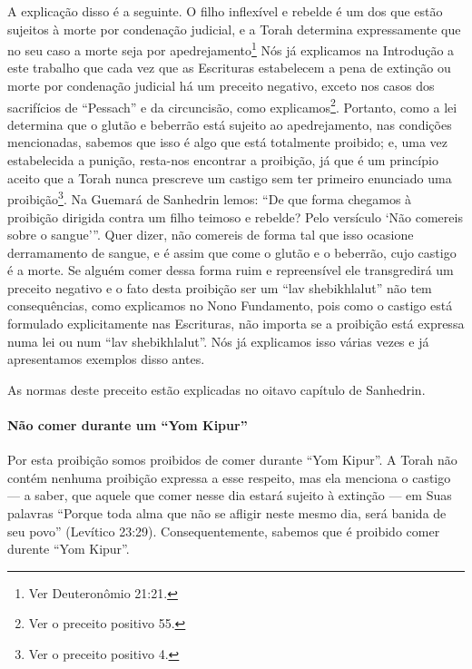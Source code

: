A explicação disso é a seguinte. O filho inflexível e rebelde é um dos
que estão sujeitos à morte por condenação judicial, e a Torah determina
expressamente que no seu caso a morte seja por
apedrejamento\footnote{Ver Deuteronômio 21:21.} Nós já explicamos na Introdução a
este trabalho que cada vez que as Escrituras estabelecem a pena de
extinção ou morte por condenação judicial há um preceito negativo,
exceto nos casos dos sacrifícios de ``Pessach'' e da circuncisão, como
explicamos\footnote{Ver o preceito positivo 55.}. Portanto, como a lei determina que o
glutão e beberrão está sujeito ao apedrejamento, nas condições
mencionadas, sabemos que isso é algo que está totalmente proibido; e,
uma vez estabelecida a punição, resta-nos encontrar a proibição, já que
é um princípio aceito que a Torah nunca prescreve um castigo sem ter
primeiro enunciado uma proibição\footnote{Ver o preceito positivo 4.}. Na Guemará de
Sanhedrin lemos: ``De que forma chegamos à proibição dirigida contra um
filho teimoso e rebelde? Pelo versículo `Não comereis sobre o sangue'''.
Quer dizer, não comereis de forma tal que isso ocasione derramamento de
sangue, e é assim que come o glutão e o beberrão, cujo castigo é a
morte. Se alguém comer dessa forma ruim e repreensível ele transgredirá
um preceito negativo e o fato desta proibição ser um ``lav
shebikhlalut'' não tem consequências, como explicamos no Nono
Fundamento, pois como o castigo está formulado explicitamente nas
Escrituras, não importa se a proibição está expressa numa lei ou num
``lav shebikhlalut''. Nós já explicamos isso várias vezes e já
apresentamos exemplos disso antes.

As normas deste preceito estão explicadas no oitavo capítulo de Sanhedrin.

\paragraph{Não comer durante um ``Yom Kipur''}

Por esta proibição somos proibidos de comer durante ``Yom Kipur''. A
Torah não contém nenhuma proibição expressa a esse respeito, mas ela
menciona o castigo --- a saber, que aquele que comer nesse dia estará
sujeito à extinção --- em Suas palavras ``Porque toda alma que não se
afligir neste mesmo dia, será banida de seu povo'' (Levítico 23:29).
Consequentemente, sabemos que é proibido comer durente ``Yom Kipur''.

